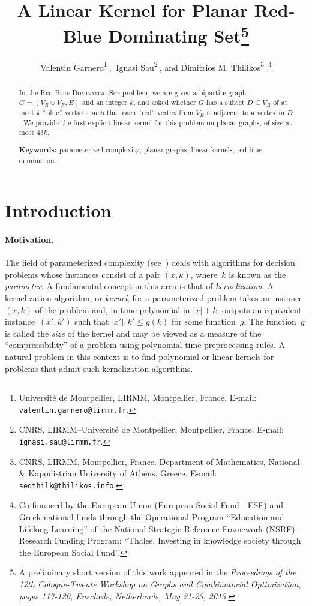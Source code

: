 \documentclass[a4paper,11pt]{article}
\title{A Linear Kernel for Planar Red-Blue Dominating Set\thanks{A preliminary short version of this work appeared in the\emph{ Proceedings of the 12th Cologne-Twente Workshop on Graphs and Combinatorial Optimization, pages 117-120, Enschede, Netherlands, May 21-23,  2013}.}}
\author{Valentin Garnero\footnote{Universit\'e de Montpellier,  LIRMM, Montpellier, France.
        E-mail: \texttt{\small{valentin.garnero@lirmm.fr}}.}$\
        $,$\  $
        Ignasi Sau\footnote{CNRS, LIRMM--Universit\'e de Montpellier, Montpellier, France.
        E-mail: \texttt{\small{ignasi.sau@lirmm.fr}}.}$\
        $, and 
        Dimitrios M. Thilikos\footnote{CNRS, LIRMM, Montpellier, France. Department of Mathematics, National \& Kapodistrian University of Athens, Greece.
        E-mail: \texttt{\small{sedthilk@thilikos.info}}.}\ \footnote{Co-financed by the European Union (European Social Fund - ESF) and Greek national funds through the Operational Program ``Education and Lifelong Learning'' of the National Strategic Reference Framework (NSRF) - Research Funding Program: ``Thales. Investing in knowledge society through the European Social Fund''.}
        }
\date{}
\begin{document}
 \maketitle



 \begin{abstract}
In the \textsc{Red-Blue Dominating Set} problem, we are given a bipartite graph
$G = (V_B \cup V_R,E)$ and an integer $k$, and asked whether $G$ has a subset $D \subseteq V_B$ of at most $k$ ``blue'' vertices such that each ``red'' vertex from $V_R$ is adjacent to a vertex in $D$. We provide the first explicit linear kernel for this problem on planar graphs, of size at most $43k$.

\vspace{0.25cm}
\noindent \textbf{Keywords:} parameterized complexity; planar graphs; linear kernels; red-blue domination.
\end{abstract}


\section{Introduction}
\label{sec:intro}




\paragraph{Motivation.} The field of parameterized complexity (see~\cite{DF99,FG06,Nie06}) deals with algorithms for decision problems whose instances consist of a pair $(x,k)$, where~$k$ is known as the \emph{parameter}. A fundamental concept in this area is that of \emph{kernelization}. A kernelization algorithm, or \emph{kernel}, for a parameterized problem takes an instance~$(x,k)$ of the problem and, in time polynomial in $|x| + k$, outputs an equivalent instance~$(x',k')$ such that $|x'|, k' \leq g(k)$ for some
function~$g$. The function~$g$ is called the \emph{size} of the kernel and may
be viewed as a measure of the ``compressibility'' of a problem using
polynomial-time preprocessing rules. A natural problem in this context is to find
polynomial or linear kernels for problems that admit such kernelization algorithms.
\end{document}
